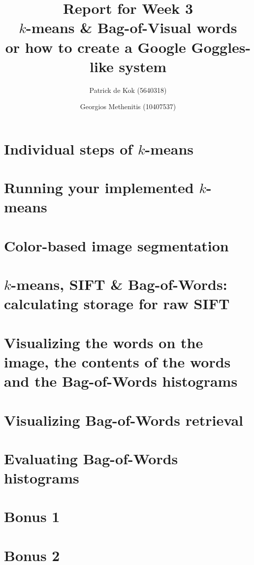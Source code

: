 \documentclass[a4paper,10pt,twoside]{article}
\title{Report for Week 3 \\\normalsize $k$-means \& Bag-of-Visual words\\ or how to create a Google Goggles-like system}
\author{Patrick de Kok (5640318) \and Georgios Methenitis (10407537)}
\begin{document}
\maketitle
\thispagestyle{empty}

\section{Individual steps of $k$-means}

\section{Running your implemented $k$-means}

\section{Color-based image segmentation}

\section{$k$-means, SIFT \& Bag-of-Words: calculating storage for raw SIFT}

\section{Visualizing the words on the image, the contents of the words and the Bag-of-Words histograms}

\section{Visualizing Bag-of-Words retrieval}

\section{Evaluating Bag-of-Words histograms}

\section{Bonus 1}

\section{Bonus 2}
\end{document}
